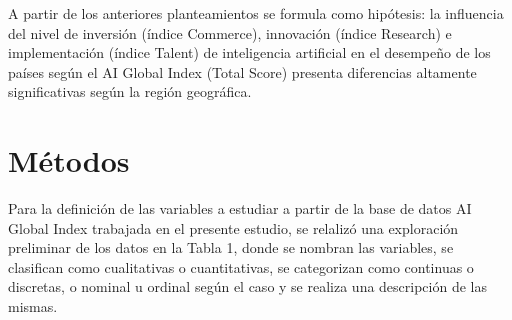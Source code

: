 \documentclass[
]{article}
\begin{document}
\begin{multicols}{2}
A partir de los anteriores planteamientos se formula como hipótesis: la influencia del nivel de inversión (índice Commerce), innovación (índice Research) e implementación (índice Talent) de inteligencia artificial en el desempeño de los países según el AI Global Index (Total Score) presenta diferencias altamente significativas según la región geográfica.




\section{Métodos}

Para la definición de las variables a estudiar a partir de la base de datos AI Global Index trabajada en el presente estudio, se relalizó una exploración preliminar de los datos en la Tabla 1, donde se nombran las variables, se clasifican como cualitativas o cuantitativas, se categorizan como continuas o discretas, o nominal u ordinal según el caso y se realiza una descripción de las mismas.\\


\end{multicols}
\end{document}
